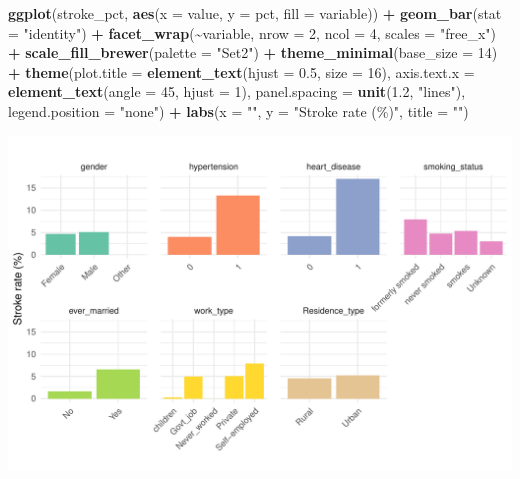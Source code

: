 \documentclass[
]{article}
\newenvironment{Shaded}{\begin{snugshade}}{\end{snugshade}}
\newcommand{\AttributeTok}[1]{\textcolor[rgb]{0.13,0.29,0.53}{#1}}
\newcommand{\DecValTok}[1]{\textcolor[rgb]{0.00,0.00,0.81}{#1}}
\newcommand{\FloatTok}[1]{\textcolor[rgb]{0.00,0.00,0.81}{#1}}
\newcommand{\FunctionTok}[1]{\textcolor[rgb]{0.13,0.29,0.53}{\textbf{#1}}}
\newcommand{\NormalTok}[1]{#1}
\newcommand{\SpecialCharTok}[1]{\textcolor[rgb]{0.81,0.36,0.00}{\textbf{#1}}}
\newcommand{\StringTok}[1]{\textcolor[rgb]{0.31,0.60,0.02}{#1}}
\begin{document}
\begin{Shaded}
\begin{Highlighting}[]
\FunctionTok{ggplot}\NormalTok{(stroke\_pct, }\FunctionTok{aes}\NormalTok{(}\AttributeTok{x =}\NormalTok{ value, }\AttributeTok{y =}\NormalTok{ pct, }\AttributeTok{fill =}\NormalTok{ variable)) }\SpecialCharTok{+}
  \FunctionTok{geom\_bar}\NormalTok{(}\AttributeTok{stat =} \StringTok{"identity"}\NormalTok{) }\SpecialCharTok{+}
  \FunctionTok{facet\_wrap}\NormalTok{(}\SpecialCharTok{\textasciitilde{}}\NormalTok{variable, }\AttributeTok{nrow =} \DecValTok{2}\NormalTok{, }\AttributeTok{ncol =} \DecValTok{4}\NormalTok{, }\AttributeTok{scales =} \StringTok{"free\_x"}\NormalTok{) }\SpecialCharTok{+}
  \FunctionTok{scale\_fill\_brewer}\NormalTok{(}\AttributeTok{palette =} \StringTok{"Set2"}\NormalTok{) }\SpecialCharTok{+}
  \FunctionTok{theme\_minimal}\NormalTok{(}\AttributeTok{base\_size =} \DecValTok{14}\NormalTok{) }\SpecialCharTok{+}
  \FunctionTok{theme}\NormalTok{(}\AttributeTok{plot.title =} \FunctionTok{element\_text}\NormalTok{(}\AttributeTok{hjust =} \FloatTok{0.5}\NormalTok{, }\AttributeTok{size =} \DecValTok{16}\NormalTok{),}
        \AttributeTok{axis.text.x =} \FunctionTok{element\_text}\NormalTok{(}\AttributeTok{angle =} \DecValTok{45}\NormalTok{, }\AttributeTok{hjust =} \DecValTok{1}\NormalTok{),}
        \AttributeTok{panel.spacing =} \FunctionTok{unit}\NormalTok{(}\FloatTok{1.2}\NormalTok{, }\StringTok{"lines"}\NormalTok{),}
        \AttributeTok{legend.position =} \StringTok{"none"}\NormalTok{) }\SpecialCharTok{+}
  \FunctionTok{labs}\NormalTok{(}\AttributeTok{x =} \StringTok{""}\NormalTok{, }\AttributeTok{y =} \StringTok{"Stroke rate (\%)"}\NormalTok{, }\AttributeTok{title =} \StringTok{""}\NormalTok{)}
\end{Highlighting}
\end{Shaded}

\includegraphics{Build-deploy-stroke-prediction-model-R_files/figure-latex/stroke-plot-1.pdf}
\end{document}
